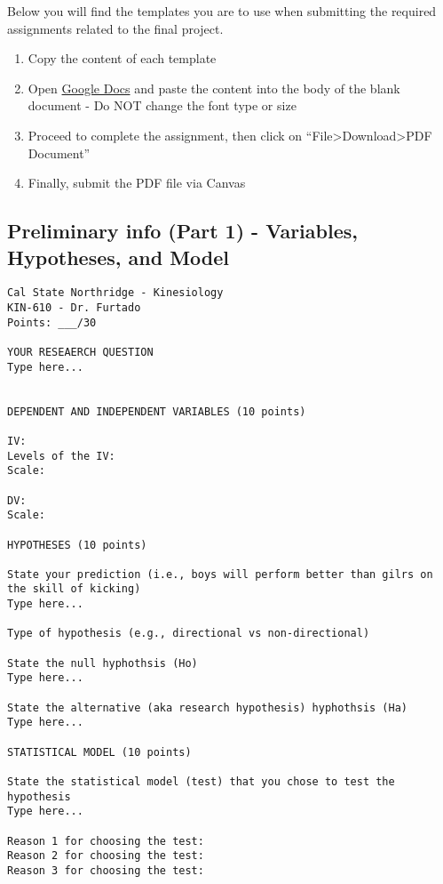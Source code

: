 \documentclass[
]{article}
\providecommand{\tightlist}{%
  \setlength{\itemsep}{0pt}\setlength{\parskip}{0pt}}
\begin{document}
Below you will find the templates you are to use when submitting the required assignments related to the final project.

\begin{enumerate}
\def\labelenumi{\arabic{enumi}.}
\tightlist
\item
  Copy the content of each template
\item
  Open \href{http://docs.google.com}{Google Docs} and paste the content into the body of the blank document - Do NOT change the font type or size
\item
  Proceed to complete the assignment, then click on ``File\textgreater Download\textgreater PDF Document''
\item
  Finally, submit the PDF file via Canvas
\end{enumerate}

\hypertarget{preliminary-info-part-1---variables-hypotheses-and-model}{%
\subsection{Preliminary info (Part 1) - Variables, Hypotheses, and Model}\label{preliminary-info-part-1---variables-hypotheses-and-model}}

\begin{verbatim}
Cal State Northridge - Kinesiology
KIN-610 - Dr. Furtado
Points: ___/30

YOUR RESEAERCH QUESTION
Type here...


DEPENDENT AND INDEPENDENT VARIABLES (10 points)

IV: 
Levels of the IV:
Scale:

DV:
Scale:

HYPOTHESES (10 points)

State your prediction (i.e., boys will perform better than gilrs on the skill of kicking)
Type here...

Type of hypothesis (e.g., directional vs non-directional)

State the null hyphothsis (Ho)
Type here...

State the alternative (aka research hypothesis) hyphothsis (Ha)
Type here...

STATISTICAL MODEL (10 points)

State the statistical model (test) that you chose to test the hypothesis
Type here...

Reason 1 for choosing the test:
Reason 2 for choosing the test:
Reason 3 for choosing the test:
\end{verbatim}
\end{document}
